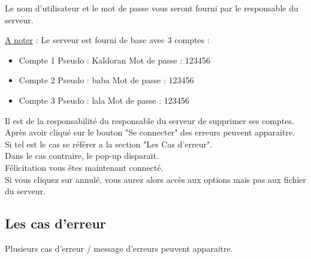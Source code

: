 \documentclass[12pt,a4paper]{article}
\begin{document}
Le nom d'utilisateur et le mot de passe vous seront fourni par le responsable du serveur.

\underline{A noter} : Le serveur est fourni de base avec 3 comptes : \\
\begin{itemize}
	\item Compte 1
		\subitem Pseudo : Kaldoran 
		\subitem Mot de passe : 123456 
	\item Compte 2
		\subitem Pseudo : baba
		\subitem Mot de passe : 123456
	\item Compte 3
		\subitem Pseudo : lala
		\subitem Mot de passe : 123456
\end{itemize}

Il est de la responsabilité du responsable du serveur de supprimer ses comptes. \\

Après avoir cliqué sur le bouton "Se connecter" des erreurs peuvent apparaitre. \\
Si tel est le cas se référer a la section "Les Cas d'erreur". \\

Dans le cas contraire, le pop-up disparait. \\
Félicitation vous êtes maintenant connecté. \\

Si vous cliquez sur annulé, vous aurez alors accès aux options mais pas aux fichier du serveur.
\subsection{Les cas d'erreur}

Plusieurs cas d'erreur / message d'erreurs peuvent apparaitre. \\
\end{document}
